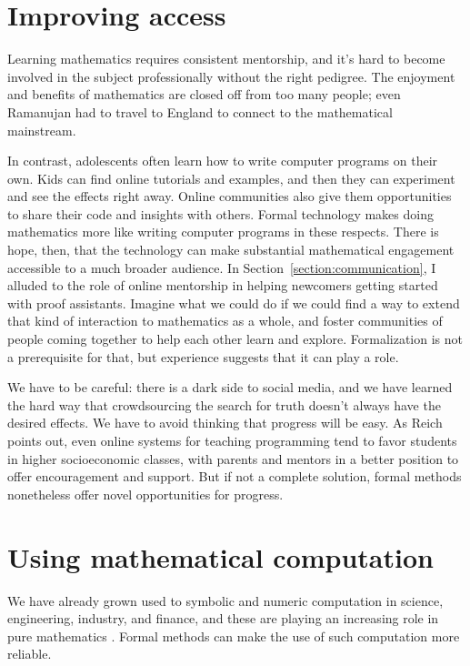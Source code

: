 \documentclass[12pt]{amsart}
\theoremstyle{definition}
\theoremstyle{remark}
\numberwithin{equation}{section}
\begin{document}
\section{Improving access}

Learning mathematics requires consistent mentorship, and it's hard to become involved in the subject professionally without the right pedigree. The enjoyment and benefits of mathematics are closed off from too many people; even Ramanujan had to travel to England to connect to the mathematical mainstream.

In contrast, adolescents often learn how to write computer programs on their own. Kids can find online tutorials and examples, and then they can experiment and see the effects right away. Online communities also give them opportunities to share their code and insights with others. Formal technology makes doing mathematics more like writing computer programs in these respects. There is hope, then, that the technology can make substantial mathematical engagement accessible to a much broader audience. In Section~\ref{section:communication}, I alluded to the role of online mentorship in helping newcomers getting started with proof assistants. Imagine what we could do if we could find a way to extend that kind of interaction to mathematics as a whole, and foster communities of people coming together to help each other learn and explore. Formalization is not a prerequisite for that, but experience suggests that it can play a role.

We have to be careful: there is a dark side to social media, and we have learned the hard way that crowdsourcing the search for truth doesn't always have the desired effects. We have to avoid thinking that progress will be easy. As Reich points out, even online systems for teaching programming tend to favor students in higher socioeconomic classes, with parents and mentors in a better position to offer encouragement and support. But if not a complete solution, formal methods nonetheless offer novel opportunities for progress.


\section{Using mathematical computation}

We have already grown used to symbolic and numeric computation in science, engineering, industry, and finance, and these are playing an increasing role in pure mathematics \cite{cohn:et:al:17,hales:14,helfgott:15}. Formal methods can make the use of such computation more reliable.
\end{document}
